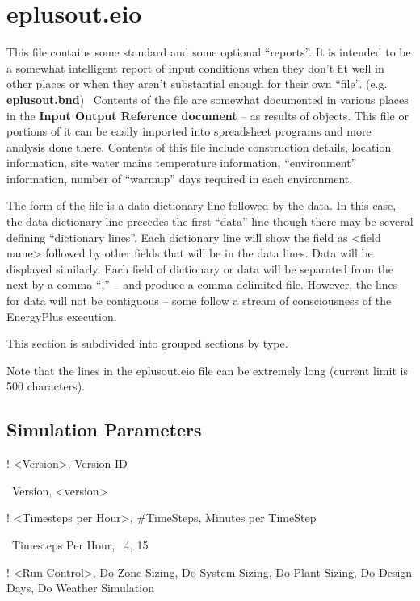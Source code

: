 \section{eplusout.eio}\label{eplusout.eio}

This file contains some standard and some optional ``reports''. It is intended to be a somewhat intelligent report of input conditions when they don't fit well in other places or when they aren't substantial enough for their own ``file''. (e.g. \textbf{eplusout.bnd})~ Contents of the file are somewhat documented in various places in the \textbf{Input Output Reference document} -- as results of objects. This file or portions of it can be easily imported into spreadsheet programs and more analysis done there. Contents of this file include construction details, location information, site water mains temperature information, ``environment'' information, number of ``warmup'' days required in each environment.

The form of the file is a data dictionary line followed by the data. In this case, the data dictionary line precedes the first ``data'' line though there may be several defining ``dictionary lines''. Each dictionary line will show the field as \textless{}field name\textgreater{} followed by other fields that will be in the data lines. Data will be displayed similarly. Each field of dictionary or data will be separated from the next by a comma ``,'' -- and produce a comma delimited file. However, the lines for data will not be contiguous -- some follow a stream of consciousness of the EnergyPlus execution.

This section is subdivided into grouped sections by type.

Note that the lines in the eplusout.eio file can be extremely long (current limit is 500 characters).

\subsection{Simulation Parameters}\label{simulation-parameters}

! \textless{}Version\textgreater{}, Version ID

~Version, \textless{}version\textgreater{}

! \textless{}Timesteps per Hour\textgreater{}, \#TimeSteps, Minutes per TimeStep

~Timesteps Per Hour,~ 4, 15

! \textless{}Run Control\textgreater{}, Do Zone Sizing, Do System Sizing, Do Plant Sizing, Do Design Days, Do Weather Simulation

